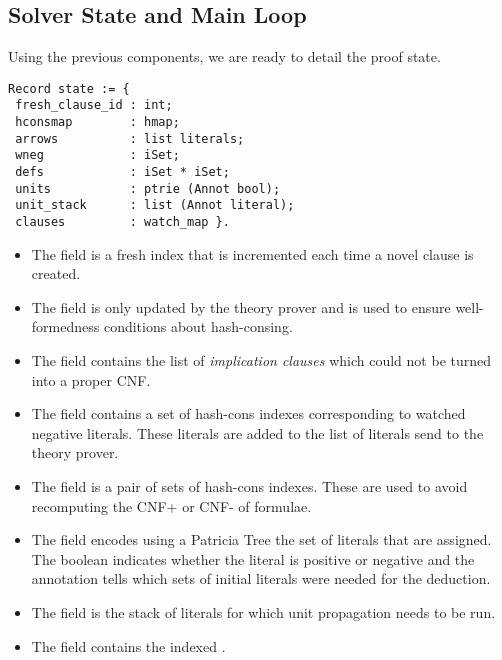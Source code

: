 \documentclass[utf8,a4paper,UKenglish,cleveref, autoref, thm-restate]{lipics-v2019}
\begin{document}
\subsection{Solver State and Main Loop}
Using the previous components, we are ready to detail the proof state. %
\begin{verbatim}
Record state := {
 fresh_clause_id : int;
 hconsmap        : hmap;
 arrows          : list literals;
 wneg            : iSet;
 defs            : iSet * iSet;
 units           : ptrie (Annot bool);
 unit_stack      : list (Annot literal);
 clauses         : watch_map }.
\end{verbatim}
\begin{itemize}
\item The field  is a fresh index that is incremented
  each time a novel clause is created.
\item The field  is only
updated by the theory prover and is used to ensure well-formedness
conditions about hash-consing.
\item The field  contains the
list of \emph{implication clauses} which could not be turned into a proper CNF.
%
\item The field  contains a set of hash-cons indexes
corresponding to watched negative literals. These literals are added
to the list of literals send to the theory prover.
\item The field  is a pair of sets of hash-cons indexes.
These are used to avoid recomputing the CNF+ or CNF- of formulae.
\item The field  encodes using a Patricia Tree the set of
literals that are assigned.  The boolean indicates whether the literal
is positive or negative and the annotation tells which sets of initial
literals were needed for the deduction.
\item The field  is the stack of literals for which
  unit propagation needs to be run.
\item The field  contains the indexed .
\end{itemize}
\end{document}

